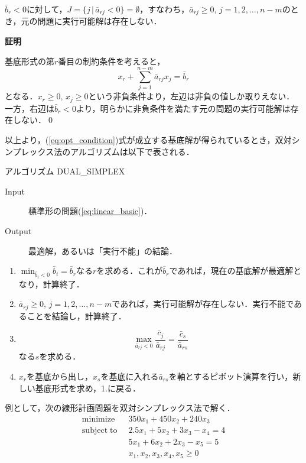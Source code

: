 \documentclass{jsreport}
\begin{document}
\begin{theo}\label{theo:dual_exists}
  $\bar{b}_r < 0$に対して，$J = \{j \, | \, \bar{a}_{rj} < 0\} = \emptyset$，すなわち，$\bar{a}_{rj} \geq 0, \, j = 1, 2, \ldots, n - m$のとき，元の問題に実行可能解は存在しない．
\end{theo}

\textbf{証明}

基底形式の第$r$番目の制約条件を考えると，
\begin{equation}
  x_r + \sum_{j = 1}^{n - m} \bar{a}_{rj} x_j = \bar{b}_r \nonumber
\end{equation}
となる．$x_r \geq 0, \, x_j \geq 0$という非負条件より，左辺は非負の値しか取りえない．一方，右辺は$\bar{b}_r < 0$より，明らかに非負条件を満たす元の問題の実行可能解は存在しない．\qed

以上より，(\ref{eq:opt_condition})式が成立する基底解が得られているとき，双対シンプレックス法のアルゴリズムは以下で表される．

\begin{itembox}[l]{アルゴリズム DUAL\_SIMPLEX}
  \begin{description}
    \item[Input] 標準形の問題(\ref{eq:linear_basic})．
    \item[Output] 最適解，あるいは「実行不能」の結論．
  \end{description}
  \begin{enumerate}
    \item $\min_{\bar{b}_i < 0} \bar{b}_i = \bar{b}_r$なる$r$を求める．これが$\bar{b}_r$であれば，現在の基底解が最適解となり，計算終了．
    \item $\bar{a}_{rj} \geq 0, \, j = 1, 2, \ldots, n - m$であれば，実行可能解が存在しない．実行不能であることを結論し，計算終了．
    \item
    \begin{equation}
      \max_{\bar{a}_{rj} < 0} \frac{\bar{c}_j}{\bar{a}_{rj}} = \frac{\bar{c}_s}{\bar{a}_{rs}} \nonumber
    \end{equation}
    なる$s$を求める．
    \item $x_r$を基底から出し，$x_s$を基底に入れる$\bar{a}_{rs}$を軸とするピボット演算を行い，新しい基底形式を求め，1.に戻る．
  \end{enumerate}
\end{itembox}

例として，次の線形計画問題を双対シンプレックス法で解く．
\begin{align}\label{eq:dual_ex}
  \mathrm{minimize} \; \; &350x_1 + 450x_2 + 240x_3 \nonumber \\
  \mathrm{subject \; to} \; \; &2.5x_1 + 5x_2 + 3x_3 - x_4 = 4 \\
  &5x_1 + 6x_2 + 2x_3 - x_5 = 5 \nonumber \\
  &x_1, x_2, x_3, x_4, x_5 \geq 0 \nonumber
\end{align}
\end{document}
